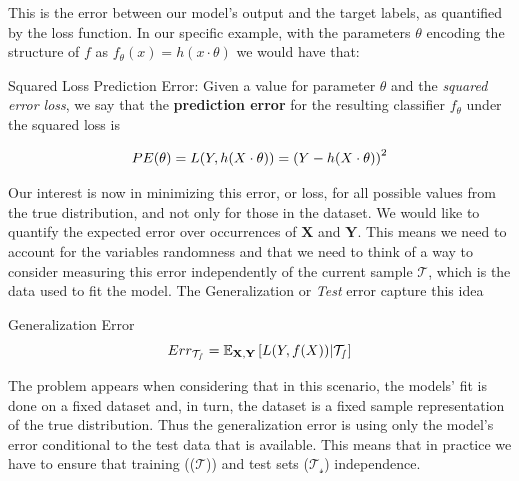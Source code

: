 This is the error between our model's output and the target labels, as quantified by the loss function.
 In our specific example, with the parameters $\theta$ encoding the structure of $f$ as $f_\theta(x) = h(x \cdot \theta)$ we would have that:

\begin{definition}{Squared Loss Prediction Error:}
	Given a value for parameter $\theta$ and the \textit{squared error loss}, we say that the \textbf{prediction error} for the resulting classifier $f_\theta$ under the squared loss is

	\begin{equation}
	PE(\theta) =L(Y, h(X \cdot \theta) )  \\
	=  {(Y - h(X \cdot \theta) )}^2
	\end{equation}

\end{definition}

Our interest is now in minimizing this error, or loss, for all possible values from the true distribution, and not only for those in the dataset.
We would like to quantify the expected error over occurrences of $\textbf{X}$ and $\textbf{Y}$.
This means we need to account for the variables randomness and that we need to think of a way to consider measuring this error independently of the current sample $\mathcal{T}$, which is the data used to fit the model.
The Generalization or \textit{Test} error capture this idea

\begin{definition}{Generalization Error}
\begin{equation}
Err_{\mathcal{T_s}} = \operatorname{\mathbb{E}}_{ \textbf{X}, \textbf{Y} } \left[ L(Y,f(X))  |  \mathcal{T_s} \right]
\end{equation}
\end{definition}

The problem appears when considering that in this scenario, the models' fit is done on a fixed dataset
and, in turn, the dataset is a fixed sample representation of the true distribution.
Thus the generalization error is using only the model's error conditional to the test data that is available.
This means that in practice we have to ensure that training (($\mathcal{T}$)) and test sets ($\mathcal{T_s}$) independence.


